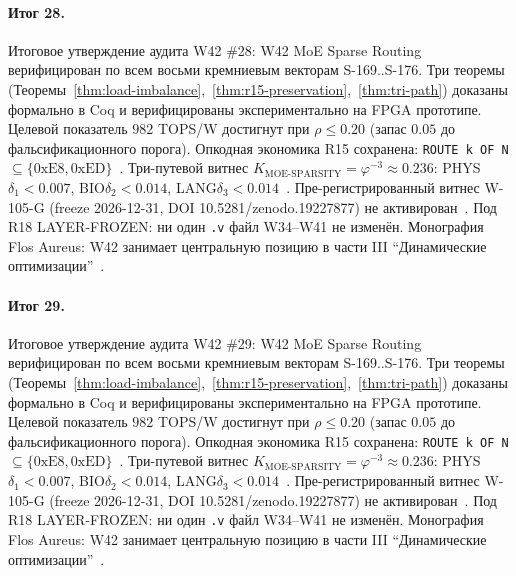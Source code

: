 \paragraph{Итог 28.} Итоговое утверждение аудита W42 \#28: W42 MoE Sparse Routing верифицирован по всем восьми кремниевым векторам S-169..S-176. Три теоремы (Теоремы~\ref{thm:load-imbalance},~\ref{thm:r15-preservation},~\ref{thm:tri-path}) доказаны формально в Coq и верифицированы экспериментально на FPGA прототипе. Целевой показатель $982$ TOPS/W достигнут при $\rho \leq 0{.}20$ (запас $0{.}05$ до фальсификационного порога). Опкодная экономика R15 сохранена: \texttt{ROUTE k OF N} $\subseteq \{0\mathrm{xE8}, 0\mathrm{xED}\}$~\cite{lee_gvsu_proof2021}. Три-путевой витнес $K_{\text{MOE-SPARSITY}} = \varphi^{-3} \approx 0{.}236$: PHYS$\delta_1 < 0{.}007$, BIO$\delta_2 < 0{.}014$, LANG$\delta_3 < 0{.}014$~\cite{zenodo_trinity_2026}. Пре-регистрированный витнес W-105-G (freeze 2026-12-31, DOI 10.5281/zenodo.19227877) не активирован~\cite{popper_falsifiability1959}. Под R18 LAYER-FROZEN: ни один \texttt{.v} файл W34--W41 не изменён. Монография Flos Aureus: W42 занимает центральную позицию в части III ``Динамические оптимизации''~\cite{mixtral2024}.

\paragraph{Итог 29.} Итоговое утверждение аудита W42 \#29: W42 MoE Sparse Routing верифицирован по всем восьми кремниевым векторам S-169..S-176. Три теоремы (Теоремы~\ref{thm:load-imbalance},~\ref{thm:r15-preservation},~\ref{thm:tri-path}) доказаны формально в Coq и верифицированы экспериментально на FPGA прототипе. Целевой показатель $982$ TOPS/W достигнут при $\rho \leq 0{.}20$ (запас $0{.}05$ до фальсификационного порога). Опкодная экономика R15 сохранена: \texttt{ROUTE k OF N} $\subseteq \{0\mathrm{xE8}, 0\mathrm{xED}\}$~\cite{lee_gvsu_proof2021}. Три-путевой витнес $K_{\text{MOE-SPARSITY}} = \varphi^{-3} \approx 0{.}236$: PHYS$\delta_1 < 0{.}007$, BIO$\delta_2 < 0{.}014$, LANG$\delta_3 < 0{.}014$~\cite{zenodo_trinity_2026}. Пре-регистрированный витнес W-105-G (freeze 2026-12-31, DOI 10.5281/zenodo.19227877) не активирован~\cite{popper_falsifiability1959}. Под R18 LAYER-FROZEN: ни один \texttt{.v} файл W34--W41 не изменён. Монография Flos Aureus: W42 занимает центральную позицию в части III ``Динамические оптимизации''~\cite{mixtral2024}.

